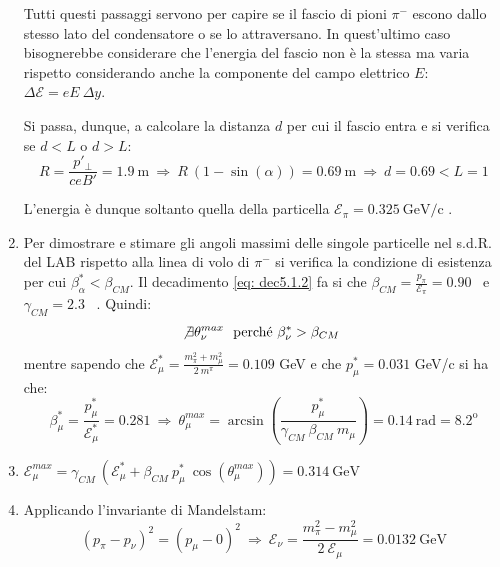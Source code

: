 \documentclass[12pt,twoside,a4]{article}
\begin{document}
\begin{solution}
\begin{enumerate}[label=(\textit{\roman*})]
\begin{figure}[h]
\begin{flushright}
\begin{minipage}[]{.49\textwidth}
\begin{figure}[H]
        \end{figure}
		  \end{minipage}
    \end{flushright}
	\end{figure}
 

Tutti questi passaggi servono per capire se il fascio di pioni $\pi^-$ escono dallo stesso lato del condensatore o se lo attraversano. In quest'ultimo caso bisognerebbe considerare che l'energia del fascio non è la stessa ma varia rispetto considerando anche la componente del campo elettrico $E$: $\Delta \mathcal{E} = eE \ \Delta y$. 

Si passa, dunque, a calcolare la distanza $d$ per cui il fascio entra e si verifica se $d < L$ o $d > L$: 
\begin{equation*}
    R = \frac{p'_\bot}{ceB'} = 1.9 \ \mathrm{m}  \  \Rightarrow  \  R\ (1-\sin{(\alpha)}) = 0.69 \ \mathrm{m}  \  \Rightarrow  \  d = 0.69 < L = 1  
\end{equation*}

L'energia è dunque soltanto quella della particella $\mathcal{E}_\pi = 0.325 \ \mathrm{GeV/c}$ .

\item Per dimostrare e stimare gli angoli massimi delle singole particelle nel s.d.R. del LAB rispetto alla linea di volo di $\pi^-$ si verifica la condizione di esistenza per cui $\beta^\ast_\alpha < \beta_{CM}$. Il decadimento \ref{eq: dec5.1.2} fa si che $\beta_{CM} = \frac{p_\pi}{\mathcal{E}_\pi} = 0.90$ \ e \ $\gamma_{CM} = 2.3$ \ . Quindi: \begin{equation*}
    \not\exists \theta^{max}_\nu \  \text{ perché } \beta^\ast_\nu > \beta_{CM}  \  
\end{equation*}
mentre sapendo che $\mathcal{E}^\ast_\mu = \frac{m^2_\pi + m^2_\mu}{2 \ m^\pi} = 0.109$ GeV e che $p^\ast_\mu = 0.031 $ GeV/c si ha che:   \begin{equation*}
    \beta^\ast_\mu = \frac{p^\ast_\mu}{\mathcal{E}^\ast_\mu} = 0.281  \  \Rightarrow  \  \theta^{max}_\mu = \arcsin{\left(\frac{p^\ast_\mu}{\gamma_{CM} \ \beta_{CM} \ m_\mu}\right)} = 0.14 \ \mathrm{rad} = 8.2^\mathrm{o} 
\end{equation*}

\item $\mathcal{E}^{max}_\mu = \gamma_{CM} \ (\mathcal{E}^\ast_\mu + \beta_{CM} \ p^\ast_\mu \ \cos{(\theta^{max}_\mu)}) = 0.314 \ \mathrm{GeV}$

\item Applicando l'invariante di Mandelstam: \begin{equation*}
    (p_\pi - p_\nu)^2=(p_\mu - 0)^2  \  \Rightarrow  \  \mathcal{E}_\nu = \frac{m^2_\pi - m^2_\mu}{2 \ \mathcal{E}_\mu} = 0.0132 \ \mathrm{GeV} 
\end{equation*}


\end{enumerate}
\end{solution}
\end{document}
